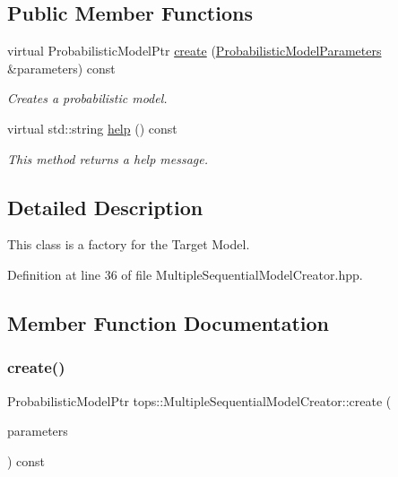 \subsection*{Public Member Functions}
\begin{DoxyCompactItemize}
\item 
virtual Probabilistic\+Model\+Ptr \hyperlink{classtops_1_1MultipleSequentialModelCreator_acfa2befa902d9dd44ae84cefd2b9c452}{create} (\hyperlink{classtops_1_1ProbabilisticModelParameters}{Probabilistic\+Model\+Parameters} \&parameters) const
\begin{DoxyCompactList}\small\item\em Creates a probabilistic model. \end{DoxyCompactList}\item 
\mbox{\label{classtops_1_1MultipleSequentialModelCreator_a0730eb10c85d73f81c103d8beb70f856}} 
virtual std\+::string \hyperlink{classtops_1_1MultipleSequentialModelCreator_a0730eb10c85d73f81c103d8beb70f856}{help} () const
\begin{DoxyCompactList}\small\item\em This method returns a help message. \end{DoxyCompactList}\end{DoxyCompactItemize}


\subsection{Detailed Description}
This class is a factory for the Target Model. 

Definition at line 36 of file Multiple\+Sequential\+Model\+Creator.\+hpp.



\subsection{Member Function Documentation}
\mbox{\label{classtops_1_1MultipleSequentialModelCreator_acfa2befa902d9dd44ae84cefd2b9c452}} 
\subsubsection{\texorpdfstring{create()}{create()}}
{\footnotesize\ttfamily Probabilistic\+Model\+Ptr tops\+::\+Multiple\+Sequential\+Model\+Creator\+::create (\begin{DoxyParamCaption}\item[{\hyperlink{classtops_1_1ProbabilisticModelParameters}{Probabilistic\+Model\+Parameters} \&}]{parameters }\end{DoxyParamCaption}) const\hspace{0.3cm}{\ttfamily [virtual]}}




